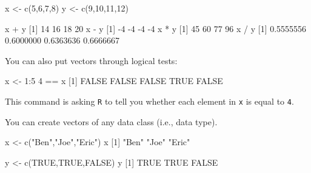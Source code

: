 \documentclass[
]{book}
\newenvironment{Shaded}{\begin{snugshade}}{\end{snugshade}}
\newcommand{\ConstantTok}[1]{\textcolor[rgb]{0.00,0.00,0.00}{#1}}
\newcommand{\DecValTok}[1]{\textcolor[rgb]{0.00,0.00,0.81}{#1}}
\newcommand{\FloatTok}[1]{\textcolor[rgb]{0.00,0.00,0.81}{#1}}
\newcommand{\FunctionTok}[1]{\textcolor[rgb]{0.00,0.00,0.00}{#1}}
\newcommand{\NormalTok}[1]{#1}
\newcommand{\OtherTok}[1]{\textcolor[rgb]{0.56,0.35,0.01}{#1}}
\newcommand{\SpecialCharTok}[1]{\textcolor[rgb]{0.00,0.00,0.00}{#1}}
\newcommand{\StringTok}[1]{\textcolor[rgb]{0.31,0.60,0.02}{#1}}
\begin{document}
\begin{Shaded}
\begin{Highlighting}[]
\NormalTok{x }\OtherTok{\textless{}{-}} \FunctionTok{c}\NormalTok{(}\DecValTok{5}\NormalTok{,}\DecValTok{6}\NormalTok{,}\DecValTok{7}\NormalTok{,}\DecValTok{8}\NormalTok{)}
\NormalTok{y }\OtherTok{\textless{}{-}} \FunctionTok{c}\NormalTok{(}\DecValTok{9}\NormalTok{,}\DecValTok{10}\NormalTok{,}\DecValTok{11}\NormalTok{,}\DecValTok{12}\NormalTok{)}

\NormalTok{x }\SpecialCharTok{+}\NormalTok{ y}
\NormalTok{[}\DecValTok{1}\NormalTok{] }\DecValTok{14} \DecValTok{16} \DecValTok{18} \DecValTok{20}
\NormalTok{x }\SpecialCharTok{{-}}\NormalTok{ y}
\NormalTok{[}\DecValTok{1}\NormalTok{] }\SpecialCharTok{{-}}\DecValTok{4} \SpecialCharTok{{-}}\DecValTok{4} \SpecialCharTok{{-}}\DecValTok{4} \SpecialCharTok{{-}}\DecValTok{4}
\NormalTok{x }\SpecialCharTok{*}\NormalTok{ y}
\NormalTok{[}\DecValTok{1}\NormalTok{] }\DecValTok{45} \DecValTok{60} \DecValTok{77} \DecValTok{96}
\NormalTok{x }\SpecialCharTok{/}\NormalTok{ y}
\NormalTok{[}\DecValTok{1}\NormalTok{] }\FloatTok{0.5555556} \FloatTok{0.6000000} \FloatTok{0.6363636} \FloatTok{0.6666667}
\end{Highlighting}
\end{Shaded}

You can also put vectors through logical tests:

\begin{Shaded}
\begin{Highlighting}[]
\NormalTok{x }\OtherTok{\textless{}{-}} \DecValTok{1}\SpecialCharTok{:}\DecValTok{5}
\DecValTok{4} \SpecialCharTok{==}\NormalTok{ x}
\NormalTok{[}\DecValTok{1}\NormalTok{] }\ConstantTok{FALSE} \ConstantTok{FALSE} \ConstantTok{FALSE}  \ConstantTok{TRUE} \ConstantTok{FALSE}
\end{Highlighting}
\end{Shaded}

This command is asking \texttt{R} to tell you whether each element in \texttt{x} is equal to \texttt{4}.

You can create vectors of any data class (i.e., data type).

\begin{Shaded}
\begin{Highlighting}[]
\NormalTok{x }\OtherTok{\textless{}{-}} \FunctionTok{c}\NormalTok{(}\StringTok{"Ben"}\NormalTok{,}\StringTok{"Joe"}\NormalTok{,}\StringTok{"Eric"}\NormalTok{) }
\NormalTok{x}
\NormalTok{[}\DecValTok{1}\NormalTok{] }\StringTok{"Ben"}  \StringTok{"Joe"}  \StringTok{"Eric"}

\NormalTok{y }\OtherTok{\textless{}{-}} \FunctionTok{c}\NormalTok{(}\ConstantTok{TRUE}\NormalTok{,}\ConstantTok{TRUE}\NormalTok{,}\ConstantTok{FALSE}\NormalTok{)}
\NormalTok{y}
\NormalTok{[}\DecValTok{1}\NormalTok{]  }\ConstantTok{TRUE}  \ConstantTok{TRUE} \ConstantTok{FALSE}
\end{Highlighting}
\end{Shaded}
\end{document}
